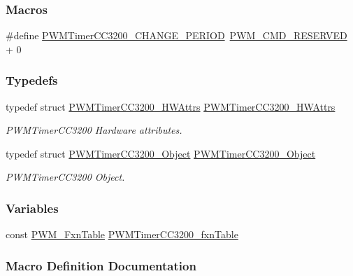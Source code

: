 \subsubsection*{Macros}
\begin{DoxyCompactItemize}
\item 
\#define \hyperlink{_p_w_m_timer_c_c3200_8h_aec237c3c3e2a1f975437d65cae9bf004}{P\+W\+M\+Timer\+C\+C3200\+\_\+\+C\+H\+A\+N\+G\+E\+\_\+\+P\+E\+R\+I\+O\+D}~\hyperlink{_p_w_m_8h_ad731f4db58c72d280900da4be6e3434c}{P\+W\+M\+\_\+\+C\+M\+D\+\_\+\+R\+E\+S\+E\+R\+V\+E\+D} + 0
\end{DoxyCompactItemize}
\subsubsection*{Typedefs}
\begin{DoxyCompactItemize}
\item 
typedef struct \hyperlink{struct_p_w_m_timer_c_c3200___h_w_attrs}{P\+W\+M\+Timer\+C\+C3200\+\_\+\+H\+W\+Attrs} \hyperlink{_p_w_m_timer_c_c3200_8h_aa7bd34f367c1c6cb5b06d68a5942bbec}{P\+W\+M\+Timer\+C\+C3200\+\_\+\+H\+W\+Attrs}
\begin{DoxyCompactList}\small\item\em P\+W\+M\+Timer\+C\+C3200 Hardware attributes. \end{DoxyCompactList}\item 
typedef struct \hyperlink{struct_p_w_m_timer_c_c3200___object}{P\+W\+M\+Timer\+C\+C3200\+\_\+\+Object} \hyperlink{_p_w_m_timer_c_c3200_8h_aab5de96f9cb61cd9fad8c91c02fb591a}{P\+W\+M\+Timer\+C\+C3200\+\_\+\+Object}
\begin{DoxyCompactList}\small\item\em P\+W\+M\+Timer\+C\+C3200 Object. \end{DoxyCompactList}\end{DoxyCompactItemize}
\subsubsection*{Variables}
\begin{DoxyCompactItemize}
\item 
const \hyperlink{struct_p_w_m___fxn_table}{P\+W\+M\+\_\+\+Fxn\+Table} \hyperlink{_p_w_m_timer_c_c3200_8h_a59acce71ed10f39839edb1a310c6b385}{P\+W\+M\+Timer\+C\+C3200\+\_\+fxn\+Table}
\end{DoxyCompactItemize}


\subsubsection{Macro Definition Documentation}
